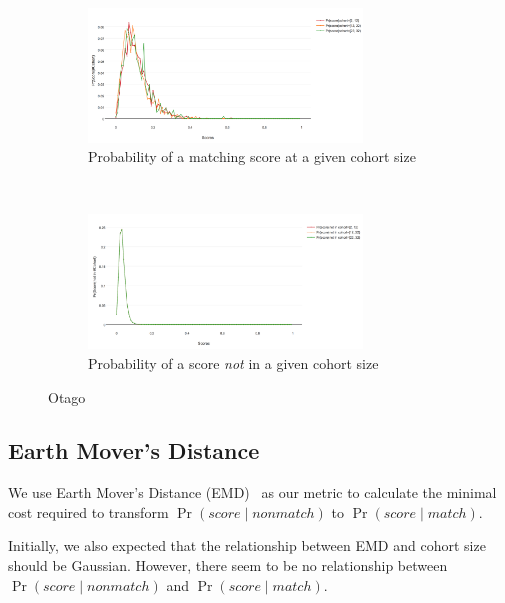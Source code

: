 \begin{figure}[htbp]
    \centering
    \begin{subfigure}[t]{\textwidth}
        \centering
        \includegraphics[width=0.8\textwidth]{dataset/otago/pscohort}
        \caption{Probability of a matching score at a given cohort size}
        \label{fig:otago_pscohort} %
    \end{subfigure}%
    \\
    \begin{subfigure}[t]{\textwidth}
        \centering
        \includegraphics[width=0.8\textwidth]{dataset/otago/psnoncohort}
        \caption{Probability of a score \emph{not} in a given cohort size}
        \label{fig:otago_psnoncohort} %
    \end{subfigure}%
    \caption{Otago}
    \label{fig:otago_psc} %
\end{figure}

\FloatBarrier%
\subsection{Earth Mover's Distance}

We use Earth Mover's Distance (EMD)~\cite{emd00} as our metric to calculate the
minimal cost required to transform $\Pr{(score \mid nonmatch)}$ to $\Pr{(score
\mid match)}$.

Initially, we also expected that the relationship between EMD and cohort size
should be Gaussian. However, there seem to be no relationship between
$\Pr{(score \mid nonmatch)}$ and $\Pr{(score \mid match)}$.

